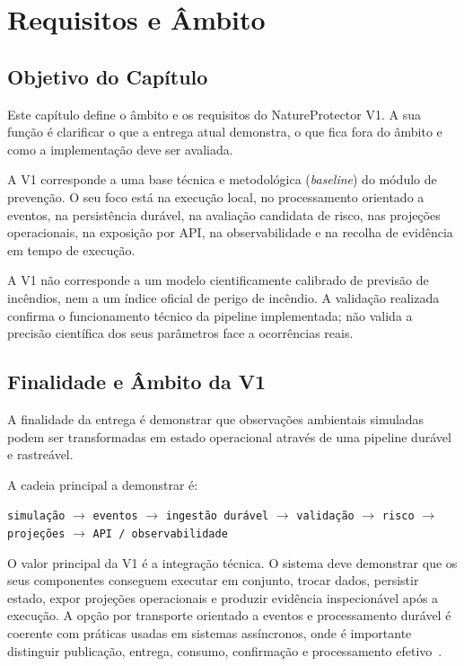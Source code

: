 \chapter{Requisitos e Âmbito}

\section{Objetivo do Capítulo}

Este capítulo define o âmbito e os requisitos do NatureProtector V1. A sua função é clarificar o que a entrega atual demonstra, o que fica fora do âmbito e como a implementação deve ser avaliada.

A V1 corresponde a uma base técnica e metodológica (\textit{baseline}) do módulo de prevenção. O seu foco está na execução local, no processamento orientado a eventos, na persistência durável, na avaliação candidata de risco, nas projeções operacionais, na exposição por API, na observabilidade e na recolha de evidência em tempo de execução.

A V1 não corresponde a um modelo cientificamente calibrado de previsão de incêndios, nem a um índice oficial de perigo de incêndio. A validação realizada confirma o funcionamento técnico da pipeline implementada; não valida a precisão científica dos seus parâmetros face a ocorrências reais.

\section{Finalidade e Âmbito da V1}

A finalidade da entrega é demonstrar que observações ambientais simuladas podem ser transformadas em estado operacional através de uma pipeline durável e rastreável.

A cadeia principal a demonstrar é:

\begin{center}
\texttt{simulação} $\rightarrow$ \texttt{eventos} $\rightarrow$ \texttt{ingestão durável} $\rightarrow$ \texttt{validação} $\rightarrow$ \texttt{risco} $\rightarrow$ \texttt{projeções} $\rightarrow$ \texttt{API / observabilidade}
\end{center}

O valor principal da V1 é a integração técnica. O sistema deve demonstrar que os seus componentes conseguem executar em conjunto, trocar dados, persistir estado, expor projeções operacionais e produzir evidência inspecionável após a execução. A opção por transporte orientado a eventos e processamento durável é coerente com práticas usadas em sistemas assíncronos, onde é importante distinguir publicação, entrega, consumo, confirmação e processamento efetivo~\citep{rabbitmq_amqp_model,rabbitmq_consumer_acknowledgements,richardson_idempotent_consumer}.

